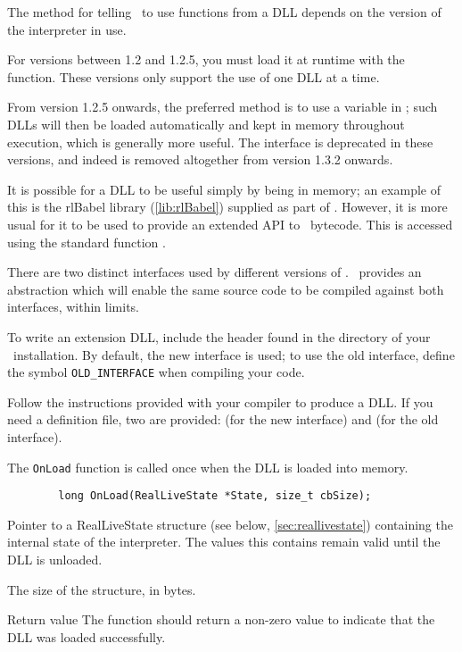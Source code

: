     The method for telling \reallive\ to use functions from a DLL depends on the 
    version of the interpreter in use.
    
    For versions between 1.2 and 1.2.5, you must load it at runtime with the 
     function.  These versions only support the use of one DLL at 
    a time.
    
    From version 1.2.5 onwards, the preferred method is to use a  
    variable in \gameexe; such DLLs will then be loaded automatically and kept 
    in memory throughout execution, which is generally more useful.  The 
     interface is deprecated in these versions, and indeed is 
    removed altogether from version 1.3.2 onwards.
    
    It is possible for a DLL to be useful simply by being in memory; an example 
    of this is the rlBabel library (\ref{lib:rlBabel}) supplied as part of 
    \package.  However, it is more usual for it to be used to provide an 
    extended API to \reallive\ bytecode.  This is accessed using the standard
    function .
  
\lstset{language=[Visual]C++}
  
    There are two distinct interfaces used by different versions of \reallive. 
    \package\ provides an abstraction which will enable the same source code to 
    be compiled against both interfaces, within limits.
    
    To write an extension DLL, include the header  found in the 
     directory of your \package\ installation. By default, the new 
    interface is used; to use the old interface, define the symbol
    \lstinline|OLD_INTERFACE| when compiling your code.
    
    Follow the instructions provided with your compiler to produce a DLL.  If 
    you need a definition file, two are provided:  (for the 
    new interface) and  (for the old interface).
    
      The \lstinline|OnLoad| function is called once when the DLL is loaded
      into memory.
      
      \begin{lstlisting}
        long OnLoad(RealLiveState *State, size_t cbSize);
      \end{lstlisting}
      \noindent
      \begin{nicelist}
      \item[\lstinline|*State|]
        Pointer to a RealLiveState structure (see below, 
        \ref{sec:reallivestate}) containing the internal state of the 
        interpreter. The values this contains remain valid until the DLL is 
        unloaded.
      \item[\lstinline|cbSize|]
        The size of the structure, in bytes.
      \item[Return value]
        The function should return a non-zero value to indicate that the DLL
        was loaded successfully.
      \end{nicelist}
      
